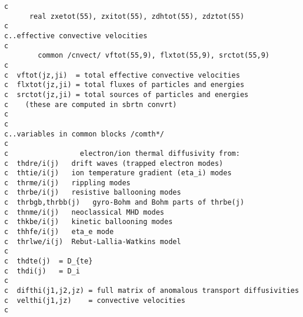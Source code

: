 \begin{verbatim}
c
      real zxetot(55), zxitot(55), zdhtot(55), zdztot(55)
c
c..effective convective velocities
c
        common /cnvect/ vftot(55,9), flxtot(55,9), srctot(55,9)
c
c  vftot(jz,ji)  = total effective convective velocities
c  flxtot(jz,ji) = total fluxes of particles and energies
c  srctot(jz,ji) = total sources of particles and energies
c    (these are computed in sbrtn convrt)
c
c
c..variables in common blocks /comth*/
c
c                 electron/ion thermal diffusivity from:
c  thdre/i(j)   drift waves (trapped electron modes)
c  thtie/i(j)   ion temperature gradient (eta_i) modes
c  thrme/i(j)   rippling modes
c  thrbe/i(j)   resistive ballooning modes
c  thrbgb,thrbb(j)   gyro-Bohm and Bohm parts of thrbe(j)
c  thnme/i(j)   neoclassical MHD modes
c  thkbe/i(j)   kinetic ballooning modes
c  thhfe/i(j)   eta_e mode
c  thrlwe/i(j)  Rebut-Lallia-Watkins model
c
c  thdte(j)  = D_{te}
c  thdi(j)   = D_i
c
c  difthi(j1,j2,jz) = full matrix of anomalous transport diffusivities
c  velthi(j1,jz)    = convective velocities
c
\end{verbatim}

